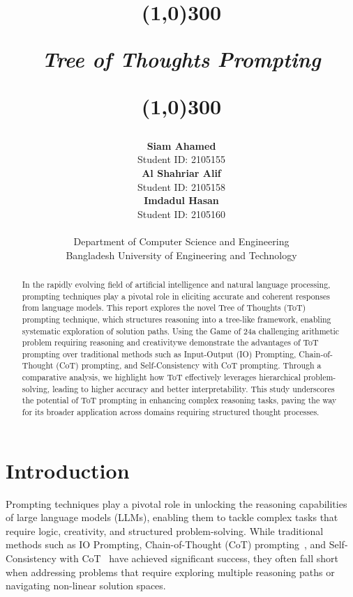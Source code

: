 \documentclass[12pt, a4paper]{article}
\title{
	\line(1,0){300}
	\endgraf\bigskip
	\Huge
	\begin{center}
		\emph{\Large{\textbf{Tree of Thoughts Prompting}}}
		
	\end{center}
	\line(1,0){300}
	\bigskip
	\bigskip
}
\author{
        \textbf{Siam Ahamed}\\Student ID: 2105155\\
        \textbf{ Al Shahriar Alif}\\Student ID: 2105158\\
        \textbf{Imdadul Hasan}\\Student ID: 2105160\\\\
	Department of Computer Science and Engineering\\
    Bangladesh University of Engineering and Technology\\
}
\date{
	\endgraf\bigskip
}
\begin{document}
	\maketitle
    \pagebreak
    
    \tableofcontents
    \setcounter{tocdepth}{2}
    \newpage
        
    \listoffigures
    \newpage
        
    \listoftables
    \newpage
    
    

       \begin{abstract}
        In the rapidly evolving field of artificial intelligence and natural language processing, prompting techniques play a pivotal role in eliciting accurate and coherent responses from language models. This report explores the novel Tree of Thoughts (ToT) prompting technique, which structures reasoning into a tree-like framework, enabling systematic exploration of solution paths. Using the Game of 24\textemdash a challenging arithmetic problem requiring reasoning and creativity\textemdash we demonstrate the advantages of ToT prompting over traditional methods such as Input-Output (IO) Prompting, Chain-of-Thought (CoT) prompting, and Self-Consistency with CoT prompting. Through a comparative analysis, we highlight how ToT effectively leverages hierarchical problem-solving, leading to higher accuracy and better interpretability. This study underscores the potential of ToT prompting in enhancing complex reasoning tasks, paving the way for its broader application across domains requiring structured thought processes.
    \end{abstract}
	\section{Introduction}

Prompting techniques play a pivotal role in unlocking the reasoning capabilities of large language models (LLMs), enabling them to tackle complex tasks that require logic, creativity, and structured problem-solving. While traditional methods such as IO Prompting, Chain-of-Thought (CoT) prompting~\cite{COT}, and Self-Consistency with CoT~\cite{SE_TOC} have achieved significant success, they often fall short when addressing problems that require exploring multiple reasoning paths or navigating non-linear solution spaces. 
\end{document}
